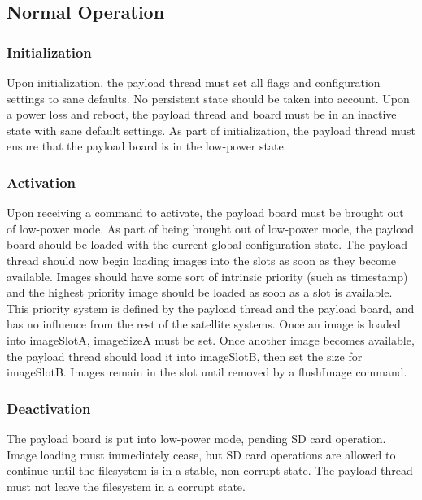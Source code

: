 \documentclass{article}
\begin{document}
\subsection{Normal Operation}
\subsubsection{Initialization}
Upon initialization, the payload thread must set all flags and configuration
settings to sane defaults. No persistent state should be taken into account. Upon
a power loss and reboot, the payload thread and board must be in an inactive state
with sane default settings. As part of initialization, the payload thread must
ensure that the payload board is in the low-power state.

\subsubsection{Activation}
Upon receiving a command to activate, the payload board must
be brought out of low-power mode. As part of being brought out of low-power
mode, the payload board should be loaded with the current global configuration
state. The payload thread should now begin loading 
images into the slots as soon as they become available. Images should have some
sort of intrinsic priority (such as timestamp) and the highest priority image
should be loaded as soon as a slot is available. This priority system is defined
by the payload thread and the payload board, and has no influence from the
rest of the satellite systems. Once an image is loaded into
imageSlotA, imageSizeA must be set. Once another image becomes available, 
the payload thread should load it into imageSlotB, then set the size for
imageSlotB. Images remain in the slot until removed by a flushImage command.

\subsubsection{Deactivation}
The payload board is put into low-power mode, pending SD card operation. 
Image loading must immediately cease, but SD card operations are allowed to
continue until the filesystem is in a stable, non-corrupt state. The
payload thread must not leave the filesystem in a corrupt state.
\end{document}
